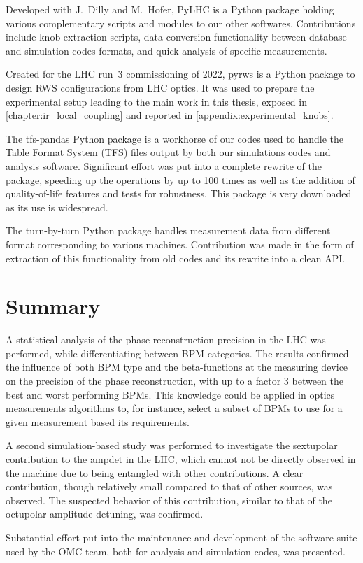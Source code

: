 Developed with J.~Dilly and M.~Hofer, PyLHC is a Python package holding various complementary scripts and modules to our other softwares.
Contributions include knob extraction scripts, data conversion functionality between database and simulation codes formats, and quick analysis of specific measurements.

Created for the \gls{LHC} \Gls{run}~\num{3} commissioning of \num{2022}, pyrws is a Python package to design \acrlong{RWS} configurations from LHC \gls{optics}.
It was used to prepare the experimental setup leading to the main work in this thesis, exposed in \cref{chapter:ir_local_coupling} and reported in \cref{appendix:experimental_knobs}.

The tfs-pandas Python package is a workhorse of our codes used to handle the Table Format System (TFS) files output by both our simulations codes and analysis software.
Significant effort was put into a complete rewrite of the package, speeding up the operations by up to \num{100} times as well as the addition of quality-of-life features and tests for robustness.
This package is very downloaded as its use is widespread.

The turn-by-turn Python package handles measurement data from different format corresponding to various machines.
Contribution was made in the form of extraction of this functionality from old codes and its rewrite into a clean API.

\section{Summary}

A statistical analysis of the phase reconstruction precision in the \gls{LHC} was performed, while differentiating between \gls{BPM} categories.
The results confirmed the influence of both BPM type and the \glspl{beta-function} at the measuring device on the precision of the phase reconstruction, with up to a factor \num{3} between the best and worst performing BPMs.
This knowledge could be applied in optics measurements algorithms to, for instance, select a subset of BPMs to use for a given measurement based its requirements.

A second simulation-based study was performed to investigate the sextupolar contribution to the \gls{ampdet} in the LHC, which cannot not be directly observed in the machine due to being entangled with other contributions.
A clear contribution, though relatively small compared to that of other sources, was observed.
The suspected behavior of this contribution, similar to that of the octupolar amplitude detuning, was confirmed.

Substantial effort put into the maintenance and development of the software suite used by the \acrshort{OMC} team, both for analysis and simulation codes, was presented.

\glsresetall                                     %
